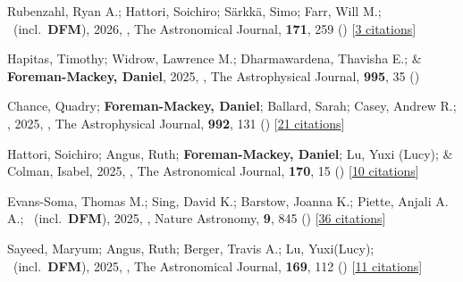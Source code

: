 \item[{\color{numcolor}\scriptsize112}] Rubenzahl, Ryan A.; Hattori, Soichiro; S{\"a}rkk{\"a}, Simo; Farr, Will M.; \etal\ (incl.\ \textbf{DFM}), 2026, , The Astronomical Journal, \textbf{171}, 259 () [\href{https://ui.adsabs.harvard.edu/abs/2026AJ....171..259R}{3 citations}]

\item[{\color{numcolor}\scriptsize111}] Hapitas, Timothy; Widrow, Lawrence M.; Dharmawardena, Thavisha E.; \& \textbf{Foreman-Mackey, Daniel}, 2025, , The Astrophysical Journal, \textbf{995}, 35 ()

\item[{\color{numcolor}\scriptsize110}] Chance, Quadry; \textbf{Foreman-Mackey, Daniel}; Ballard, Sarah; Casey, Andrew R.; \etal, 2025, , The Astrophysical Journal, \textbf{992}, 131 () [\href{https://ui.adsabs.harvard.edu/abs/2025ApJ...992..131C}{21 citations}]

\item[{\color{numcolor}\scriptsize109}] Hattori, Soichiro; Angus, Ruth; \textbf{Foreman-Mackey, Daniel}; Lu, Yuxi (Lucy); \& Colman, Isabel, 2025, , The Astronomical Journal, \textbf{170}, 15 () [\href{https://ui.adsabs.harvard.edu/abs/2025AJ....170...15H}{10 citations}]

\item[{\color{numcolor}\scriptsize108}] Evans-Soma, Thomas M.; Sing, David K.; Barstow, Joanna K.; Piette, Anjali A. A.; \etal\ (incl.\ \textbf{DFM}), 2025, , Nature Astronomy, \textbf{9}, 845 () [\href{https://ui.adsabs.harvard.edu/abs/2025NatAs...9..845E}{36 citations}]

\item[{\color{numcolor}\scriptsize107}] Sayeed, Maryum; Angus, Ruth; Berger, Travis A.; Lu, Yuxi(Lucy); \etal\ (incl.\ \textbf{DFM}), 2025, , The Astronomical Journal, \textbf{169}, 112 () [\href{https://ui.adsabs.harvard.edu/abs/2025AJ....169..112S}{11 citations}]

